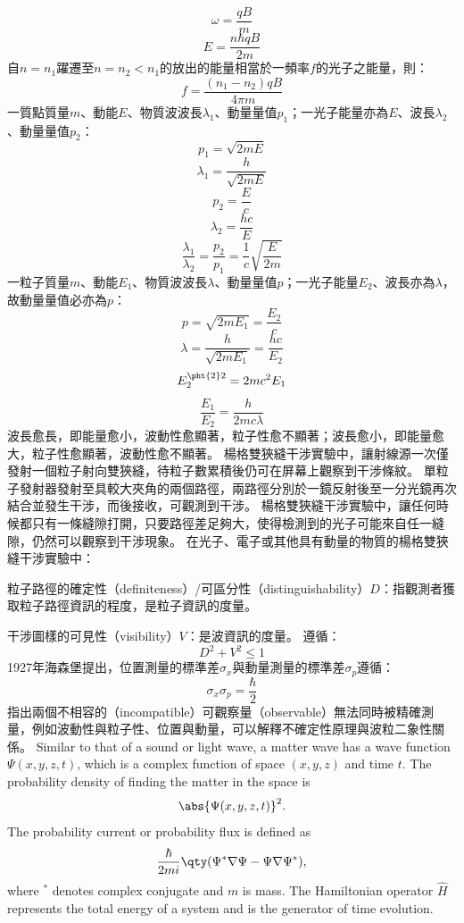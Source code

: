 \documentclass[a4paper,12pt]{article}
\begin{document}
\[\omega=\frac{qB}{m}\]
\[E=\frac{n\hbar qB}{2m}\]
自$n=n_1$躍遷至$n=n_2<n_1$的放出的能量相當於一頻率$f$的光子之能量，則：
\[f=\frac{(n_1-n_2)qB}{4\pi m}\]
一質點質量$m$、動能$E$、物質波波長$\lambda_1$、動量量值$p_1$；一光子能量亦為$E$、波長$\lambda_2$、動量量值$p_2$：
\[p_1=\sqrt{2mE}\]
\[\lambda_1=\frac{h}{\sqrt{2mE}}\]
\[p_2=\frac{E}{c}\]
\[\lambda_2=\frac{hc}{E}\]
\[\frac{\lambda_1}{\lambda_2}=\frac{p_2}{p_1}=\frac{1}{c}\sqrt{\frac{E}{2m}}\]
一粒子質量$m$、動能$E_1$、物質波波長$\lambda$、動量量值$p$；一光子能量$E_2$、波長亦為$\lambda$，故動量量值必亦為$p$：
\[p=\sqrt{2mE_1}=\frac{E_2}{c}\]
\[\lambda=\frac{h}{\sqrt{2mE_1}}=\frac{hc}{E_2}\]
\[E_2^{\pht{2}2}=2mc^2E_1\]
\[\frac{E_1}{E_2}=\frac{h}{2mc\lambda}\]
波長愈長，即能量愈小，波動性愈顯著，粒子性愈不顯著；波長愈小，即能量愈大，粒子性愈顯著，波動性愈不顯著。
楊格雙狹縫干涉實驗中，讓射線源一次僅發射一個粒子射向雙狹縫，待粒子數累積後仍可在屏幕上觀察到干涉條紋。
單粒子發射器發射至具較大夾角的兩個路徑，兩路徑分別於一鏡反射後至一分光鏡再次結合並發生干涉，而後接收，可觀測到干涉。
楊格雙狹縫干涉實驗中，讓任何時候都只有一條縫隙打開，只要路徑差足夠大，使得檢測到的光子可能來自任一縫隙，仍然可以觀察到干涉現象。
在光子、電子或其他具有動量的物質的楊格雙狹縫干涉實驗中：
\bit
\item 粒子路徑的確定性（definiteness）/可區分性（distinguishability）$D$：指觀測者獲取粒子路徑資訊的程度，是粒子資訊的度量。
\item 干涉圖樣的可見性（visibility）$V$：是波資訊的度量。
\eit
遵循：
\[D^2+V^2\leq 1\]
1927年海森堡提出，位置測量的標準差$\sigma_x$與動量測量的標準差$\sigma_p$遵循：
\[\sigma_x\sigma_p=\frac{\hbar}{2}\]
指出兩個不相容的（incompatible）可觀察量（observable）無法同時被精確測量，例如波動性與粒子性、位置與動量，可以解釋不確定性原理與波粒二象性關係。
Similar to that of a sound or light wave, a matter wave has a wave function $\Psi(x,y,z,t)$, which is a complex function of space $(x,y,z)$ and time $t$.
The probability density of finding the matter in the space is
\[\abs{\Psi(x,y,z,t)}^2.\]
The probability current or probability flux is defined as
\[\frac{\hbar}{2mi}\qty(\Psi^*\nabla\Psi-\Psi\nabla\Psi^*),\]
where $^*$ denotes complex conjugate and $m$ is mass.
The Hamiltonian operator $\hat{H}$ represents the total energy of a system and is the generator of time evolution.
\end{document}
